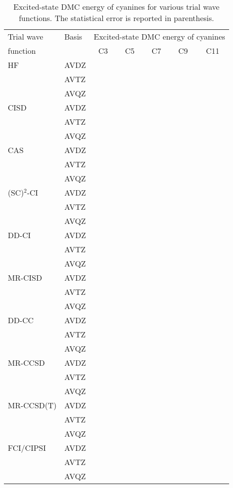\documentclass[aip,jcp,reprint,showkeys]{revtex4-1}
\newcommand{\mc}{\multicolumn}
\newcommand{\SCSC}{(SC)$^2$}
\begin{document}
\begin{table*}
	\caption{
	\label{tab:DMC-ES-energy}
	Excited-state DMC energy of cyanines for various trial wave functions.
	The statistical error is reported in parenthesis.}
	\begin{ruledtabular}
	\begin{tabular}{llccccc}
		Trial wave	&	Basis		&	\mc{5}{c}{Excited-state DMC energy of cyanines}				\\
										\cline{3-7}
		function	&				&	C3		&	C5		&	C7		&	C9		&	C11		\\
					\hline
		HF			&	AVDZ		&			&			&			&			&			\\
					&	AVTZ		&			&			&			&			&			\\
					&	AVQZ		&			&			&			&			&			\\
					\hline
		CISD		&	AVDZ		&			&			&			&			&			\\
					&	AVTZ		&			&			&			&			&			\\
					&	AVQZ		&			&			&			&			&			\\
					\hline
		CAS			&	AVDZ		&			&			&			&			&			\\
					&	AVTZ		&			&			&			&			&			\\
					&	AVQZ		&			&			&			&			&			\\
					\hline
		\SCSC-CI	&	AVDZ		&			&			&			&			&			\\
					&	AVTZ		&			&			&			&			&			\\
					&	AVQZ		&			&			&			&			&			\\
					\hline
		DD-CI		&	AVDZ		&			&			&			&			&			\\
					&	AVTZ		&			&			&			&			&			\\
					&	AVQZ		&			&			&			&			&			\\
					\hline
		MR-CISD		&	AVDZ		&			&			&			&			&			\\
					&	AVTZ		&			&			&			&			&			\\
					&	AVQZ		&			&			&			&			&			\\
					\hline
		DD-CC		&	AVDZ		&			&			&			&			&			\\
					&	AVTZ		&			&			&			&			&			\\
					&	AVQZ		&			&			&			&			&			\\
					\hline
		MR-CCSD		&	AVDZ		&			&			&			&			&			\\
					&	AVTZ		&			&			&			&			&			\\
					&	AVQZ		&			&			&			&			&			\\
					\hline
		MR-CCSD(T)	&	AVDZ		&			&			&			&			&			\\
					&	AVTZ		&			&			&			&			&			\\
					&	AVQZ		&			&			&			&			&			\\
					\hline
		FCI/CIPSI	&	AVDZ		&			&			&			&			&			\\
					&	AVTZ		&			&			&			&			&			\\
					&	AVQZ		&			&			&			&			&			\\
	\end{tabular}		
	\end{ruledtabular}		
\end{table*}		
\end{document}
